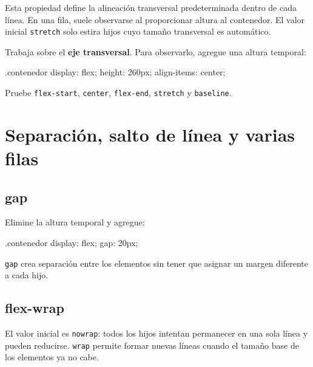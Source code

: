 \documentclass[11pt]{article}
\begin{document}
    Esta propiedad define la alineación transversal predeterminada dentro de cada línea. En una fila, suele observarse al proporcionar altura al contenedor. El valor inicial \texttt{stretch} solo estira hijos cuyo tamaño transversal es automático.

    Trabaja sobre el \textbf{eje transversal}. Para observarlo, agregue una altura temporal:

    \begin{csscodedark}
        .contenedor {
            display: flex;
            height: 260px;
            align-items: center;
        }
    \end{csscodedark}

    Pruebe \texttt{flex-start}, \texttt{center}, \texttt{flex-end}, \texttt{stretch} y \texttt{baseline}.


    \section{Separación, salto de línea y varias filas}

    \subsection{gap}

    Elimine la altura temporal y agregue:

    \begin{csscodedark}
        .contenedor {
            display: flex;
            gap: 20px;
        }
    \end{csscodedark}

    \texttt{gap} crea separación entre los elementos sin tener que asignar un margen diferente a cada hijo.

    \subsection{flex-wrap}

    El valor inicial es \texttt{nowrap}: todos los hijos intentan permanecer en una sola línea y pueden reducirse. \texttt{wrap} permite formar nuevas líneas cuando el tamaño base de los elementos ya no cabe.
\end{document}
